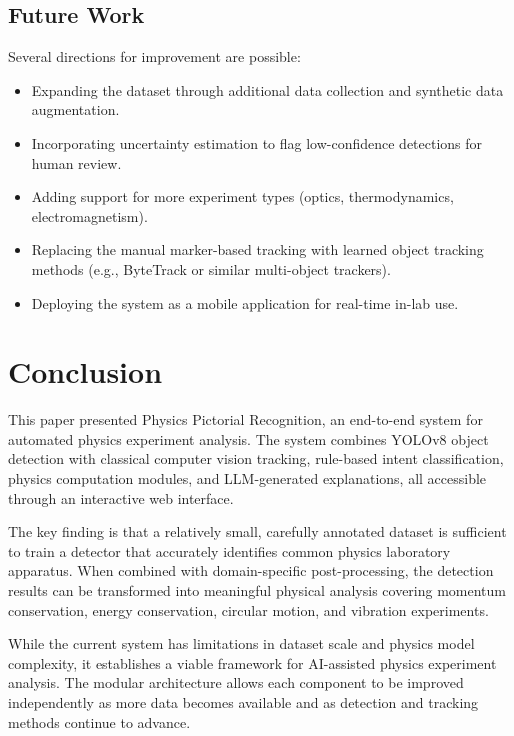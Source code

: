 \documentclass[12pt]{article}
\begin{document}
\subsection{Future Work}

Several directions for improvement are possible:
\begin{itemize}[noitemsep]
  \item Expanding the dataset through additional data collection and synthetic data augmentation.
  \item Incorporating uncertainty estimation to flag low-confidence detections for human review.
  \item Adding support for more experiment types (optics, thermodynamics, electromagnetism).
  \item Replacing the manual marker-based tracking with learned object tracking methods (e.g., ByteTrack or similar multi-object trackers).
  \item Deploying the system as a mobile application for real-time in-lab use.
\end{itemize}

\section{Conclusion}

This paper presented Physics Pictorial Recognition, an end-to-end system for automated physics experiment analysis. The system combines YOLOv8 object detection with classical computer vision tracking, rule-based intent classification, physics computation modules, and LLM-generated explanations, all accessible through an interactive web interface.

The key finding is that a relatively small, carefully annotated dataset is sufficient to train a detector that accurately identifies common physics laboratory apparatus. When combined with domain-specific post-processing, the detection results can be transformed into meaningful physical analysis covering momentum conservation, energy conservation, circular motion, and vibration experiments.

While the current system has limitations in dataset scale and physics model complexity, it establishes a viable framework for AI-assisted physics experiment analysis. The modular architecture allows each component to be improved independently as more data becomes available and as detection and tracking methods continue to advance.
\end{document}
